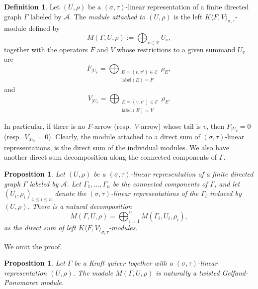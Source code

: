 \documentclass[12pt]{amsart}
\newtheorem{proposition}[theorem]{Proposition}
\theoremstyle{definition}
\newtheorem{definition}[theorem]{Definition}
\newcommand{\<}{\langle}   %
\renewcommand{\>}{\rangle} %
\begin{document}
\begin{definition}\label{DefinitionModuleAttachedToKraftQuiver}
    Let $(U,\rho)$ be a $(\sigma,\tau)$-linear representation of a finite directed graph $\Gamma$ labeled by $\mathcal A$. The \textit{module attached to $(U,\rho)$} is the left $K\langle F,V\rangle_{\sigma,\tau}$-module defined by 
    \begin{equation*}
        M(\Gamma,U,\rho) := \bigoplus_{v \in \mathcal V} U_v,
    \end{equation*}
    together with the operators $F$ and $V$ whose restrictions to a given summand $U_v$ are
    \begin{equation*}
        F_{|U_v} = \bigoplus_{\substack{E = (v,v') \in \mathcal E\\ \mathrm{label}(E)  = F}} \rho_E,
    \end{equation*}
    and 
    \begin{equation*}
        V_{|U_v} = \bigoplus_{\substack{E = (v,v') \in \mathcal E\\ \mathrm{label}(E)  = V}} \rho_E.
    \end{equation*}
\end{definition}

In particular, if there is no $F$-arrow (resp.~$V$-arrow) whose tail is $v$, then $F_{|U_v} = 0$ (resp.~$V_{|U_v} = 0$). Clearly, the module attached to a direct sum of $(\sigma,\tau)$-linear representations, is the direct sum of the individual modules. We also have another direct sum decomposition along the connected components of $\Gamma$.

\begin{proposition}
    Let $(U,\rho)$ be a $(\sigma,\tau)$-linear representation of a finite directed graph $\Gamma$ labeled by $\mathcal A$. Let $\Gamma_1,\ldots , \Gamma_n$ be the connected components of $\Gamma$, and let $(U_i,\rho_i)_{1\leq i \leq n}$ denote the $(\sigma,\tau)$-linear representations of the $\Gamma_i$ induced by $(U,\rho)$. There is a natural decomposition
    \begin{equation*}
        M(\Gamma,U,\rho) = \bigoplus_{i=1}^n M(\Gamma_i,U_i,\rho_i),
    \end{equation*}
    as the direct sum of left $K\langle F,V \rangle_{\sigma,\tau}$-modules.
\end{proposition}

We omit the proof.

\begin{proposition}
    Let $\Gamma$ be a Kraft quiver together with a $(\sigma,\tau)$-linear representation $(U,\rho)$. The module $M(\Gamma,U,\rho)$ is naturally a twisted Gelfand-Ponomarev module.
\end{proposition}
\end{document}

